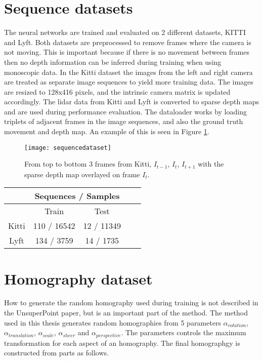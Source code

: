 \section{Sequence datasets}

The neural networks are trained and evaluated on 2 different datasets, KITTI\cite{kitti} and Lyft\cite{lyft2019}. Both datasets are preprocessed to remove frames where the camera is not moving. This is important because if there is no movement between frames then no depth information can be inferred during training when using monoscopic data. In the Kitti dataset the images from the left and right camera are treated as separate image sequences to yield more training data. The images are resized to 128x416 pixels, and the intrinsic camera matrix is updated accordingly. The lidar data from Kitti and Lyft is converted to sparse depth maps and are used during performance evaluation. The dataloader works by loading triplets of adjacent frames in the image sequences, and also the ground truth movement and depth map. An example of this is seen in Figure \ref{fig:sequencedataset}.

\begin{figure}[H]
	\centering
	\texttt{[image: sequencedataset]}
	\caption{From top to bottom 3 frames from Kitti, $I_{t-1}$, $I_t$, $I_{t+1}$ with the sparse depth map overlayed on frame $I_t$.}
	\label{fig:sequencedataset}
\end{figure}

\begin{center}
	\begin{tabular}{ |c|c|c|c|c| } 
		\hline
		&\multicolumn{2}{c|}{Sequences / Samples} \\ 
		\hline
		& Train & Test \\ 
		\hline
		Kitti & 110 / 16542 & 12 / 11349 \\ 
		\hline
		Lyft & 134 / 3759 & 14 / 1735 \\ 
		\hline
	\end{tabular}
\end{center}

\section{Homography dataset}

How to generate the random homography used during training is not described in the UnsuperPoint paper, but is an important part of the method. The method used in this thesis generates random homographies from 5 parameters $\alpha_{rotation}$, $\alpha_{translation}$, $\alpha_{scale}$, $\alpha_{sheer}$ and $\alpha_{perspective}$. The parameters controls the maximum transformation for each aspect of an homography. The final homographgy is constructed from parts as follows.

